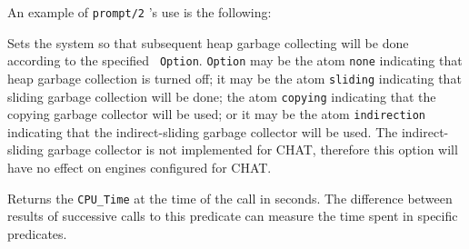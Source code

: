 \begin{description}
    An example of {\tt prompt/2} 's use is the following:


 Sets the system so that subsequent heap
    garbage collecting will be done according to the specified {\tt
    Option}.  {\tt Option} may be the atom \verb|none| indicating that
    heap garbage collection is turned off; it may be the atom
    \verb|sliding| indicating that sliding garbage collection will be
    done; the atom \verb|copying| indicating that the copying garbage
    collector will be used; or it may be the atom \verb|indirection|
    indicating that the indirect-sliding garbage collector will be
    used.  The indirect-sliding garbage collector is not implemented
    for CHAT, therefore this option will have no effect on engines
    configured for CHAT.
 
    Returns the {\tt CPU\_Time} at the time of the call in seconds.
    The difference between results of successive calls to this
    predicate can measure the time spent in specific predicates.


\end{description}
